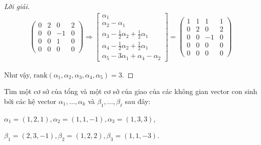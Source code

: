 \documentclass[class=linearalgebra,crop=false]{standalone}
\begin{document}
\begin{proof}[Lời giải]
\begin{align*}
\begin{pmatrix}
            0 & 2 & 0 & 2 \\
            0 & 0 & -1 & 0 \\
            0 & 0 & 1 & 0 \\
            0 & 0 & 0 & 0
        \end{pmatrix}
        \Longrightarrow
        \begin{bmatrix}
            \alpha_{1} \\
            \alpha_{2}-\alpha_{1} \\
            \alpha_{3}-\frac{1}{2}\alpha_{2}+\frac{1}{2}\alpha_{1} \\
            \alpha_{4} - \frac{1}{2}\alpha_{2} + \frac{1}{2}\alpha_{1} \\
            \alpha_{5} - 3\alpha_{1} + \alpha_{4} - \alpha_{2}
        \end{bmatrix}=
        \begin{pmatrix}
            1 & 1 & 1 & 1 \\
            0 & 2 & 0 & 2 \\
            0 & 0 & -1 & 0 \\
            0 & 0 & 0 & 0 \\
            0 & 0 & 0 & 0
        \end{pmatrix}
    \end{align*}
    \par Như vậy, $\text{rank}(\alpha_{1},\alpha_{2},\alpha_{3},\alpha_{4},\alpha_{5}) = 3$.
\end{proof}

\par Tìm một cơ sở của tổng và một cơ sở của giao của các không gian vector con sinh bởi các hệ vector $\alpha_{1},\ldots,\alpha_{k}$ và $\beta_{1},\ldots,\beta_{\ell}$ sau đây:

\begin{exercise}$\alpha_{1} = (1,2,1), \alpha_{2} = (1,1,-1), \alpha_{3} = (1,3,3)$,
    \par $\beta_{1} = (2,3,-1), \beta_{2} = (1,2,2), \beta_{3} = (1,1,-3)$.
\end{exercise}
\end{document}
